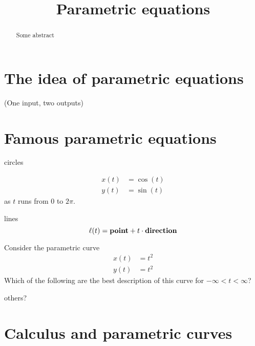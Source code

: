 \documentclass{ximera}
\title[Dig-In:]{Parametric equations}
\begin{document}
\begin{abstract}
Some abstract
\end{abstract}
\maketitle

\section{The idea of parametric equations}

(One input, two outputs)

\section{Famous parametric equations}

circles


\begin{align*}
  x(t) &= \cos(t)\\
  y(t) &= \sin(t)
\end{align*}
as $t$ runs from $0$ to $2\pi$.



lines
\[
\ell(t) = \mathbf{point} + t\cdot \mathbf{direction}
\]



\begin{question}
  Consider the parametric curve
  \begin{align*}
  x(t) &= t^2\\
  y(t) &=t^2
  \end{align*}
  Which of the following are the best description of this curve for
  $-\infty<t<\infty$?
  \begin{multipleChoice}
  \end{multipleChoice}
\end{question}


others?



\section{Calculus and parametric curves}
\end{document}
